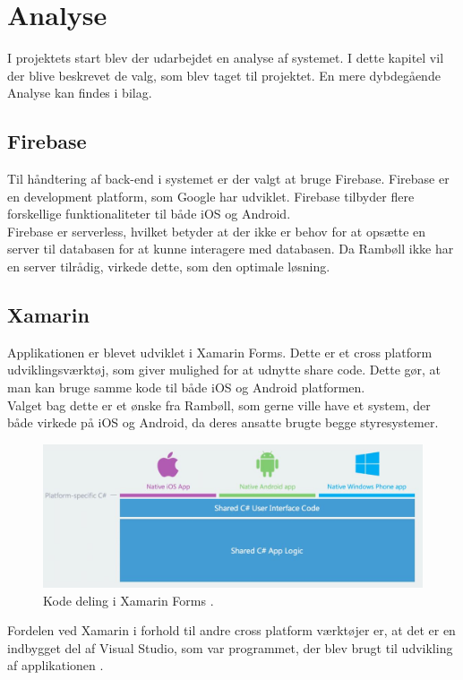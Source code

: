 \chapter{Analyse}
I projektets start blev der udarbejdet en analyse af systemet. I dette kapitel vil der blive beskrevet de valg, som blev taget til projektet. En mere dybdegående Analyse kan findes i bilag. \\

\section{Firebase}
	Til håndtering af back-end i systemet er der valgt at bruge Firebase. Firebase\cite{Firebase} er en development platform, som Google har udviklet. Firebase tilbyder flere forskellige funktionaliteter til både iOS og Android. \\
	Firebase er serverless, hvilket betyder at der ikke er behov for at opsætte en server til databasen for at kunne interagere med databasen. Da Rambøll ikke har en server tilrådig, virkede dette, som den optimale løsning. \\

\section{Xamarin}
	Applikationen er blevet udviklet i Xamarin Forms\cite{Xarmain}. Dette er et cross platform udviklingsværktøj, som giver mulighed for at udnytte share code. Dette gør, at man kan bruge samme kode til både iOS og Android platformen. \\
	Valget bag dette er et ønske fra Rambøll, som gerne ville have et system, der både virkede på iOS og Android, da deres ansatte brugte begge styresystemer.
	
	\begin{figure}[H]
		\centering
		\includegraphics[width=1\linewidth]{Analyse/XarmarinShare}
		\caption{Kode deling i Xamarin Forms \cite{Xarmain}.}
		\label{fig:CodeShare}
	\end{figure}
	
	Fordelen ved Xamarin i forhold til andre cross platform værktøjer er, at det er en indbygget del af Visual Studio, som var programmet, der blev brugt til udvikling af applikationen \cite{VisualStudio}. \\